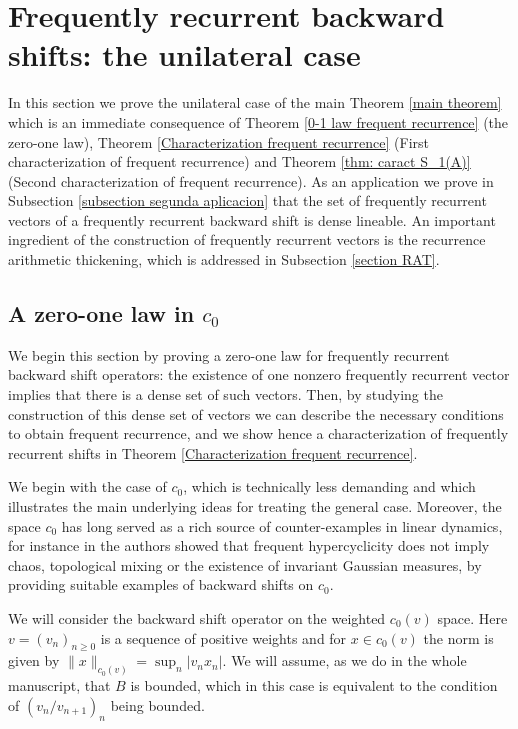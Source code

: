 \documentclass[11pt]{amsart}
\begin{document}
\section{Frequently recurrent backward shifts: the unilateral case}\label{section unilateral}
In this section we prove the unilateral case of the main Theorem \ref{main theorem} which is an immediate consequence of Theorem \ref{0-1 law frequent recurrence} (the zero-one law), Theorem \ref{Characterization frequent recurrence} (First characterization of frequent recurrence) and Theorem \ref{thm: caract S_1(A)} (Second characterization of frequent  recurrence).
As an application we prove in Subsection \ref{subsection segunda aplicacion} that the set of frequently recurrent vectors of a frequently recurrent backward shift is dense lineable.
An important ingredient of the construction of frequently recurrent vectors is the recurrence arithmetic thickening, which is addressed in Subsection \ref{section RAT}.


\subsection{A zero-one law in ${c_0}$}\label{subsection primer caracterizacion}
We begin this section by proving a zero-one law for frequently recurrent backward shift operators: the existence of one nonzero frequently recurrent vector implies that there is a dense set of such vectors. Then, by studying the construction of this dense set of vectors  we can describe the necessary conditions to obtain frequent recurrence, and we show hence a characterization of frequently recurrent shifts in Theorem \ref{Characterization frequent recurrence}.


We begin with the case of $c_0$, which is  technically less demanding and which illustrates the main underlying ideas for treating the general case. Moreover, the space $c_0$ has long served as a rich source of counter-examples in linear dynamics, for instance in \cite{BayGri07} the authors showed that frequent hypercyclicity  does not imply chaos, topological mixing or the existence of invariant Gaussian measures, by providing suitable examples of backward shifts on $c_0$. 

We will consider the backward shift operator on the weighted $c_0(v)$ space. Here $v=(v_n)_{n\ge 0}$ is a sequence of positive weights and for $x\in c_0(v)$ the norm is given by $\|x\|_{c_0(v)}=\sup_n|v_nx_n|$. We will assume, as we do in the whole manuscript, that $B$ is bounded, which in this case is equivalent to the condition of $(v_n/v_{n+1})_n$ being  bounded.
\end{document}
